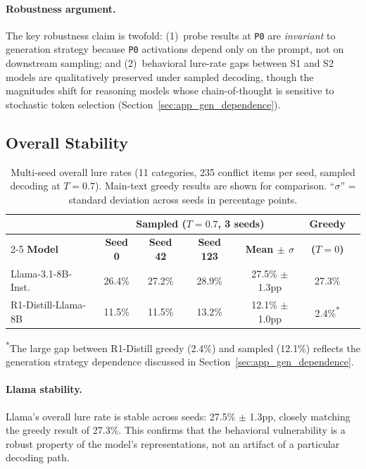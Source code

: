\documentclass{article}
\newcommand{\pzero}{\texttt{P0}}
\begin{document}
\paragraph{Robustness argument.}
The key robustness claim is twofold: (1)~probe results at \pzero{}
are \emph{invariant} to generation strategy because \pzero{} activations
depend only on the prompt, not on downstream sampling; and
(2)~behavioral lure-rate gaps between S1 and S2 models are qualitatively
preserved under sampled decoding, though the magnitudes shift for
reasoning models whose chain-of-thought is sensitive to stochastic
token selection (Section~\ref{sec:app_gen_dependence}).

\subsection{Overall Stability}

\begin{table}[ht]
\centering
\caption{Multi-seed overall lure rates (11 categories, 235 conflict
  items per seed, sampled decoding at $T = 0.7$).  Main-text greedy
  results are shown for comparison.  ``$\sigma$'' = standard deviation
  across seeds in percentage points.}
\label{tab:robustness_overall}
\vspace{4pt}
\small
\begin{tabular}{lcccccc}
\toprule
& \multicolumn{4}{c}{\textbf{Sampled ($T = 0.7$, 3 seeds)}} & \textbf{Greedy} \\
\cmidrule(lr){2-5}
\textbf{Model} & \textbf{Seed 0} & \textbf{Seed 42} & \textbf{Seed 123} & \textbf{Mean $\pm$ $\sigma$} & \textbf{($T = 0$)} \\
\midrule
Llama-3.1-8B-Inst. & 26.4\% & 27.2\% & 28.9\% & 27.5\% $\pm$ 1.3pp & 27.3\% \\
R1-Distill-Llama-8B & 11.5\% & 11.5\% & 13.2\% & 12.1\% $\pm$ 1.0pp & 2.4\%\textsuperscript{*} \\
\bottomrule
\end{tabular}

\vspace{4pt}
\small\textsuperscript{*}The large gap between R1-Distill greedy (2.4\%) and
sampled (12.1\%) reflects the generation strategy dependence
discussed in Section~\ref{sec:app_gen_dependence}.
\end{table}

\paragraph{Llama stability.}
Llama's overall lure rate is stable across seeds:
27.5\% $\pm$ 1.3pp, closely matching the greedy result of 27.3\%.
This confirms that the behavioral vulnerability is a robust property
of the model's representations, not an artifact of a particular
decoding path.
\end{document}

